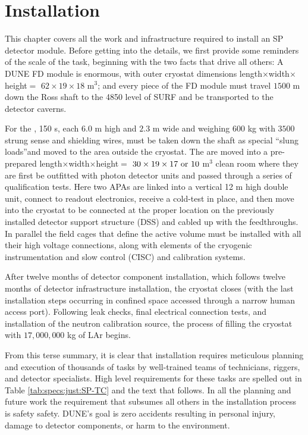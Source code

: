 \chapter{Installation}
\label{ch:sp-tc}

This chapter covers all the work and infrastructure required to install an SP detector module. 
Before getting into the details, we first provide some reminders of the scale of the task, beginning with the two facts that drive all others: A DUNE FD module is enormous, with outer cryostat dimensions length$\times $width$\times $height$=$ $62\times 19\times 18$ m$^{3}$; and every piece of the FD module must travel $1500$ \si{m} down the Ross shaft to the 4850 level of SURF and be transported to the detector caverns.

For the , 150 s, each $6.0$ m high and $2.3$ m wide and  weighing $600$ kg with $3500$ strung sense and shielding wires, must be taken down the shaft as special \textquotedblleft slung loads\textquotedblright and moved to the area outside the  cryostat. 
The  are moved into a pre-prepared length$\times $width$\times $height$=$ $30\times 19 \times 17\ {\rm or}\ 10$ m$^{3}$ clean room where they are first be outfitted  with photon detector units and passed through a series of qualification tests.
Here two APAs are linked into a vertical 12 m high double unit, connect to readout electronics, receive a cold-test in place, and then move into the cryostat to be connected at the proper location on the previously installed detector support structure (DSS) and cabled up with the feedthroughs. 
In parallel the field cages that define the  active volume must be installed with all their high voltage connections, along with  elements of the cryogenic instrumentation and slow control (CISC) and calibration systems.

After twelve months of detector component installation, which follows twelve months of detector infrastructure installation, the cryostat closes (with the last installation steps occurring in confined space accessed through a narrow human access port). 
Following leak checks, final electrical connection tests, and installation of the neutron calibration source, the process of filling the cryostat with $17,000,000$ kg of LAr begins.

From this terse summary, it is clear that installation requires meticulous planning and execution of thousands of tasks by well-trained teams of technicians, riggers, and detector specialists. 
High level requirements for these tasks are spelled out in Table \ref{tab:specs:just:SP-TC} and the text that follows. 
In all the planning and future work the requirement that subsumes all others in the installation process is safety safety. DUNE's goal is zero accidents resulting in personal injury, damage to detector components, or harm to the environment.

